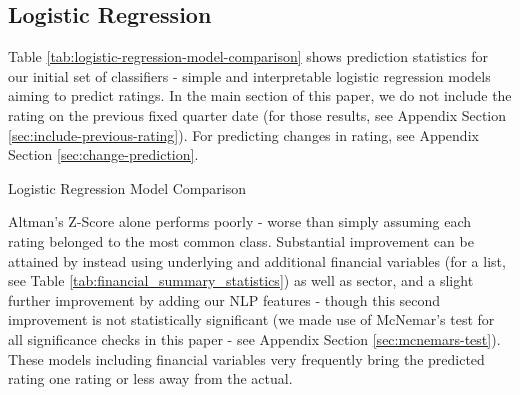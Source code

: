 \documentclass{article}[11pt]
\begin{document}
    \subsection*{Logistic Regression}

    Table \ref{tab:logistic-regression-model-comparison} shows prediction statistics for our initial set of classifiers - simple and interpretable logistic regression models aiming to predict ratings. In the main section of this paper, we do not include the rating on the previous fixed quarter date (for those results, see Appendix Section \ref{sec:include-previous-rating}). For predicting changes in rating, see Appendix Section \ref{sec:change-prediction}.
    
    \begin{table}[h!]
        \centering
        \caption{Logistic Regression Model Comparison}
        
        \label{tab:logistic-regression-model-comparison}
    \end{table}

    Altman's Z-Score alone performs poorly - worse than simply assuming each rating belonged to the most common class. Substantial improvement can be attained by instead using underlying and additional financial variables (for a list, see Table \ref{tab:financial_summary_statistics}) as well as sector, and a slight further improvement by adding our NLP features - though this second improvement is not statistically significant (we made use of McNemar's test for all significance checks in this paper - see Appendix Section \ref{sec:mcnemars-test}). These models including financial variables very frequently bring the predicted rating one rating or less away from the actual.
\end{document}
